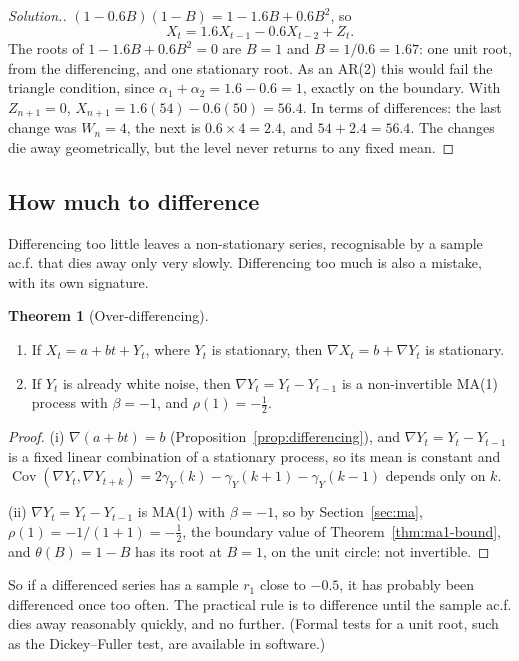 \documentclass[11pt,a4paper]{article}
\theoremstyle{definition}
\newtheorem{thm}{Theorem}[subsection]
\newenvironment{solution}
  {\renewcommand{\qedsymbol}{}\begin{proof}[\textit{Solution}.]}
  {\end{proof}}
\DeclareMathOperator{\Cov}{Cov}
\begin{document}
\begin{solution}
$(1 - 0.6B)(1 - B) = 1 - 1.6B + 0.6B^2$, so
\[
X_t = 1.6X_{t-1} - 0.6X_{t-2} + Z_t .
\]
The roots of $1 - 1.6B + 0.6B^2 = 0$ are $B = 1$ and $B = 1/0.6 = 1.67$: one unit root, from the differencing, and one stationary root. As an
AR(2) this would fail the triangle condition, since $\alpha_1 + \alpha_2 = 1.6 - 0.6 = 1$, exactly on the boundary. With $Z_{n+1} = 0$,
$X_{n+1} = 1.6(54) - 0.6(50) = 56.4$. In terms of differences: the last change was $W_n = 4$, the next is $0.6 \times 4 = 2.4$, and $54 + 2.4 = 56.4$. The
changes die away geometrically, but the level never returns to any fixed mean.
\end{solution}

\subsection{How much to difference}
Differencing too little leaves a non-stationary series, recognisable by a sample ac.f. that dies away only
very slowly. Differencing too much is also a mistake, with its own signature.

\begin{thm}[Over-differencing]\label{thm:overdifference}
\begin{enumerate}[label=(\roman*)]
\item If $X_t = a + bt + Y_t$, where $Y_t$ is stationary, then $\nabla X_t = b + \nabla Y_t$ is stationary.
\item If $Y_t$ is already white noise, then $\nabla Y_t = Y_t - Y_{t-1}$ is a non-invertible MA(1) process with $\beta = -1$, and $\rho(1) = -\frac12$.
\end{enumerate}
\end{thm}

\begin{proof}
(i) $\nabla(a + bt) = b$ (Proposition~\ref{prop:differencing}), and $\nabla Y_t = Y_t - Y_{t-1}$ is a fixed linear combination of a stationary process, so its
mean is constant and $\Cov(\nabla Y_t, \nabla Y_{t+k}) = 2\gamma_Y(k) - \gamma_Y(k + 1) - \gamma_Y(k - 1)$ depends only on $k$.

(ii) $\nabla Y_t = Y_t - Y_{t-1}$ is MA(1) with $\beta = -1$, so by Section~\ref{sec:ma}, $\rho(1) = -1/(1 + 1) = -\frac12$, the boundary value of
Theorem~\ref{thm:ma1-bound}, and $\theta(B) = 1 - B$ has its root at $B = 1$, on the unit circle: not invertible.
\end{proof}

So if a differenced series has a sample $r_1$ close to $-0.5$, it has probably been differenced once too often. The
practical rule is to difference until the sample ac.f. dies away reasonably quickly, and no further. (Formal
tests for a unit root, such as the Dickey--Fuller test, are available in software.)
\end{document}

